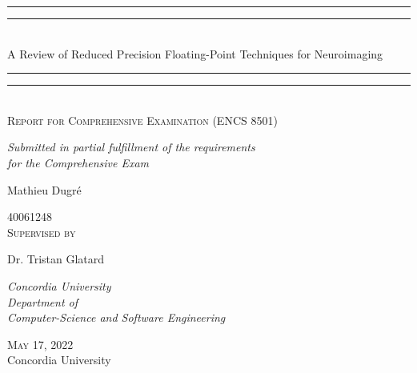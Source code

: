 \documentclass{report}
\begin{document}

\newlength{\drop}
\begin{titlepage}
	\textheight
	\centering
	\vspace*{\baselineskip}
					
	\rule{\textwidth}{1.6pt}\vspace*{-\baselineskip}\vspace*{2pt}
	\rule{\textwidth}{0.4pt}\\[\baselineskip]
	{\LARGE A Review of Reduced Precision Floating-Point Techniques for Neuroimaging}\\[0.2\baselineskip]
	\rule{\textwidth}{0.4pt}\vspace*{-\baselineskip}\vspace{3.2pt}
	\rule{\textwidth}{1.6pt}\\[\baselineskip]
				
	{\scshape Report for Comprehensive Examination (ENCS 8501)}\\
	{\itshape Submitted in partial fulfillment of the requirements \\ for the Comprehensive Exam\par}
	\vspace*{2\baselineskip}
						
	{\Large Mathieu Dugré \par}
	{40061248}\\[2\baselineskip]
	{\scshape Supervised by}\\[0.2\baselineskip]
	{\Large Dr. Tristan Glatard \par}
	{\itshape Concordia University \\  Department of \\ Computer-Science and Software Engineering\par}
						    
	\vfill
	{\scshape May 17, 2022} \\
	{\large Concordia University}\par
\end{titlepage}

\tableofcontents

\clearpage
{}








\end{document}
